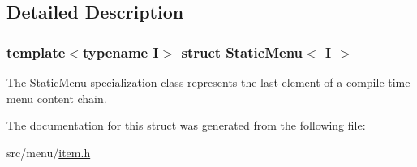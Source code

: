 \subsection{Detailed Description}
\subsubsection*{template$<$typename I$>$\newline
struct Static\+Menu$<$ I $>$}

The \hyperlink{classStaticMenu}{Static\+Menu} specialization class represents the last element of a compile-\/time menu content chain. 

The documentation for this struct was generated from the following file\+:\begin{DoxyCompactItemize}
\item 
src/menu/\hyperlink{item_8h}{item.\+h}\end{DoxyCompactItemize}
